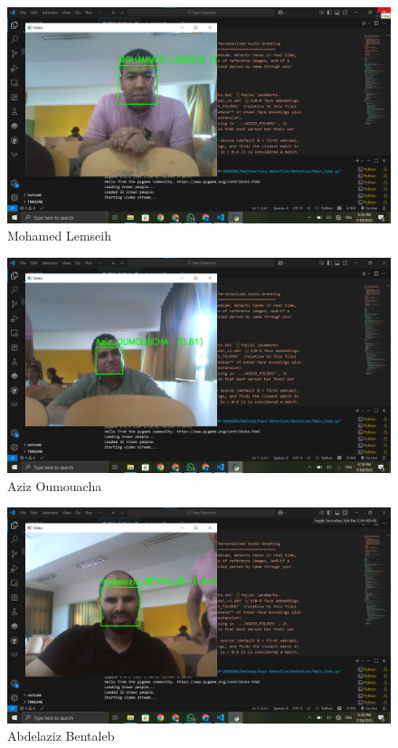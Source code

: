 \documentclass[12pt,a4paper]{article}
\begin{document}
\begin{figure}[H]
  \centering
  \includegraphics[width=\textwidth]{Mohamed_LEMSEIH.png}
  \caption{Mohamed Lemseih}
  \label{fig:mohamed}
\end{figure}

\begin{figure}[H]
  \centering
  \includegraphics[width=\textwidth]{Aziz_OUMOUACHA.png}
  \caption{Aziz Oumouacha}
  \label{fig:aziz}
\end{figure}

\begin{figure}[H]
  \centering
  \includegraphics[width=\textwidth]{Abdelaziz_BENTALEB.png}
  \caption{Abdelaziz Bentaleb}
  \label{fig:abdelaziz}
\end{figure}
\end{document}
